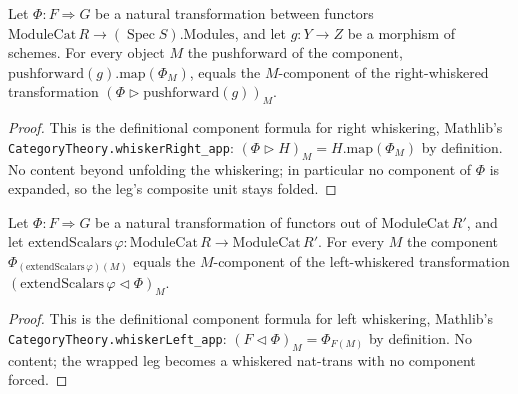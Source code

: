 
\begin{lemma}


  \label{lem:ring_square_glue_whiskerRight_lift}
  Let \(\Phi : F \Rightarrow G\) be a natural transformation between functors
  \(\mathrm{ModuleCat}\,R \to (\operatorname{Spec} S).\mathrm{Modules}\), and let \(g : Y \to Z\) be a
  morphism of schemes. For every object \(M\) the pushforward of the component,
  \(\mathrm{pushforward}(g).\mathrm{map}(\Phi_M)\), equals the \(M\)-component of the right-whiskered
  transformation \((\Phi \rhd \mathrm{pushforward}(g))_M\).
  \begin{proof}
    This is the definitional component formula for right whiskering, Mathlib's
    \texttt{CategoryTheory.whiskerRight\_app}: \((\Phi \rhd H)_M = H.\mathrm{map}(\Phi_M)\) by
    definition. No content beyond unfolding the whiskering; in particular no component of \(\Phi\) is
    expanded, so the leg's composite unit stays folded.
  \end{proof}
\end{lemma}

\begin{lemma}


  \label{lem:ring_square_glue_whiskerLeft_lift}
  Let \(\Phi : F \Rightarrow G\) be a natural transformation of functors out of
  \(\mathrm{ModuleCat}\,R'\), and let \(\mathrm{extendScalars}\,\varphi : \mathrm{ModuleCat}\,R \to
  \mathrm{ModuleCat}\,R'\). For every \(M\) the component
  \(\Phi_{(\mathrm{extendScalars}\,\varphi)(M)}\) equals the \(M\)-component of the left-whiskered
  transformation \((\mathrm{extendScalars}\,\varphi \lhd \Phi)_M\).
  \begin{proof}
    This is the definitional component formula for left whiskering, Mathlib's
    \texttt{CategoryTheory.whiskerLeft\_app}: \((F \lhd \Phi)_M = \Phi_{F(M)}\) by definition. No
    content; the wrapped leg becomes a whiskered nat-trans with no component forced.
  \end{proof}
\end{lemma}

